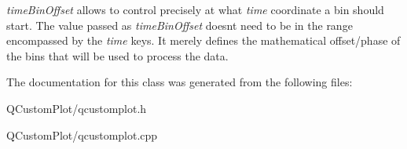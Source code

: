{\itshape time\+Bin\+Offset} allows to control precisely at what {\itshape time} coordinate a bin should start. The value passed as {\itshape time\+Bin\+Offset} doesn\textquotesingle{}t need to be in the range encompassed by the {\itshape time} keys. It merely defines the mathematical offset/phase of the bins that will be used to process the data. 

The documentation for this class was generated from the following files\+:\begin{DoxyCompactItemize}
\item 
Q\+Custom\+Plot/qcustomplot.\+h\item 
Q\+Custom\+Plot/qcustomplot.\+cpp\end{DoxyCompactItemize}
